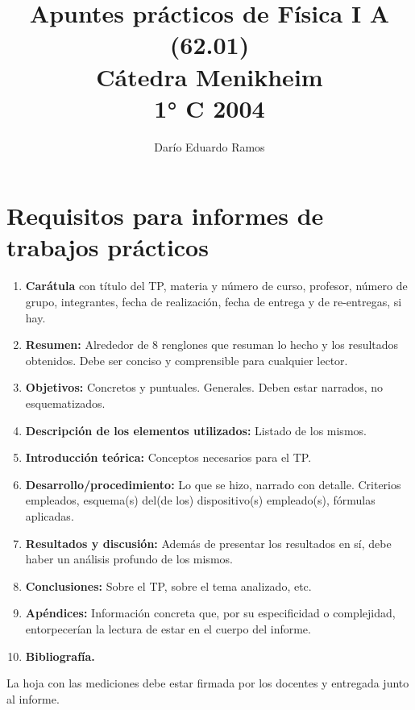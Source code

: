 \documentclass{article}
\title{Apuntes prácticos de Física I A (62.01) \\ Cátedra Menikheim \\ 1° C 2004}
\author{Darío Eduardo Ramos}
\begin{document}
\maketitle
\tableofcontents{}
\newpage

\section{Requisitos para informes de trabajos prácticos}

\begin{enumerate}
\item \textbf{Carátula} con título del TP, materia y número de curso, profesor, número de grupo, integrantes, fecha de realización, fecha de entrega y de re-entregas, si hay.
\item \textbf{Resumen:} Alrededor de 8 renglones que resuman lo hecho y los resultados obtenidos. Debe ser conciso y comprensible para cualquier lector.
\item \textbf{Objetivos:} Concretos y puntuales. Generales. Deben estar narrados, no esquematizados.
\item \textbf{Descripción de los elementos utilizados:} Listado de los mismos.
\item \textbf{Introducción teórica:} Conceptos necesarios para el TP.
\item \textbf{Desarrollo/procedimiento:} Lo que se hizo, narrado con detalle. Criterios empleados, esquema(s) del(de los) dispositivo(s) empleado(s), fórmulas aplicadas.
\item \textbf{Resultados y discusión:} Además de presentar los resultados en sí, debe haber un análisis profundo de los mismos.
\item \textbf{Conclusiones:} Sobre el TP, sobre el tema analizado, etc.
\item \textbf{Apéndices:} Información concreta que, por su especificidad o complejidad, entorpecerían la lectura de estar en el cuerpo del informe.
\item \textbf{Bibliografía.}
\end{enumerate}

La hoja con las mediciones debe estar firmada por los docentes y entregada junto al informe.
\end{document}
